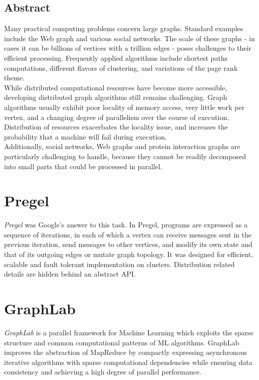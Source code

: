 \documentclass[letterpaper,twocolumn,10pt]{article}
\begin{document}
\subsection*{Abstract}
Many practical computing problems concern large graphs. Standard examples include the Web graph and various social networks. The scale of these graphs - in cases it can be billions of vertices with a trillion edges - poses challenges to their efficient processing.
Frequently applied algorithms include shortest paths computations, different flavors of clustering, and variations of the page rank theme.\\
While distributed computational resources have become more accessible, developing distributed graph algorithms still remains challenging.
Graph algorithms usually exhibit poor locality of memory access, very little work per vertex, and a changing degree of parallelism over the course of execution. Distribution of resources exacerbates the locality issue, and increases the probability that a machine 
will fail during execution.\\
Additionally, social networks, Web graphs and protein interaction graphs are particularly challenging to handle, because they cannot be readily decomposed into small parts that could be processed in parallel.



\section{Pregel}
\textit{Pregel} was Google's answer to this task. In Pregel, programs are expressed as a sequence of iterations, in each of which a vertex can receive messages sent in the previous iteration, send messages to other vertices, and modify its own state and that of its outgoing edges or mutate graph topology. It was designed for efficient, scalable and fault tolerant implementation on clusters. Distribution related details are hidden behind an abstract API.

\section{GraphLab}
\textit{GraphLab} is a parallel framework for Machine Learning which exploits the sparse structure and common computational patterns of ML algorithms.
GraphLab improves the abstraction of MapReduce by compactly expressing asynchronous iterative algorithms with sparse computational dependencies while ensuring data consistency and achieving a high degree of parallel performance.
\end{document}
